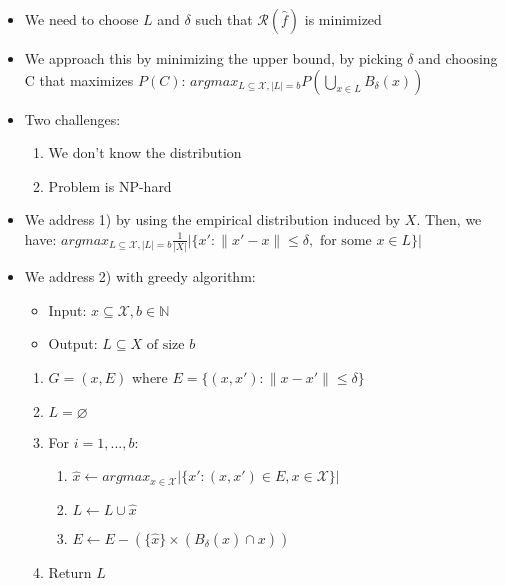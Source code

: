 \begin{itemize}
    \item We need to choose $L$ and $\delta$ such that $\mathcal{R}(\hat{f})$ is minimized
    \item We approach this by minimizing the upper bound, by picking $\delta$ and choosing C that maximizes $P(C)$:
    $argmax_{L \subseteq \mathcal{X}, |L| = b} P(\bigcup_{x \in L} B_\delta(x))$
    \item Two challenges:
    \begin{enumerate}
        \item We don't know the distribution
        \item Problem is NP-hard
    \end{enumerate}
    \item We address 1) by using the empirical distribution induced by $X$. Then, we have: $argmax_{L \subseteq \mathcal{X}, |L| = b} \frac{1}{|X|} | \{ x': \|x'-x\| \leq \delta, \textrm{ for some } x \in L \} |$
    \item We address 2) with greedy algorithm:
    \begin{itemize}
        \item Input: $x \subseteq \mathcal{X}, b \in \mathbb{N}$
        \item Output: $L \subseteq X \textrm{ of size } b$
    \end{itemize}
    \begin{enumerate}
        \item $G = (x,E)$ where $E = \{ (x,x') : \| x - x' \| \leq \delta \}$
        \item $L = \varnothing$
        \item For $i = 1, ..., b$:
        \begin{enumerate}
            \item $\hat{x} \leftarrow argmax_{x \in \mathcal{X}} | \{ x': (x,x') \in E, x \in \mathcal{X} \} |$
            \item $L \leftarrow L \cup {\hat{x}}$
            \item $E \leftarrow E - (\{ \hat{x} \} \times (B_\delta(\hat{x}) \cap x))$
        \end{enumerate}
        \item Return $L$
    \end{enumerate}
\end{itemize}